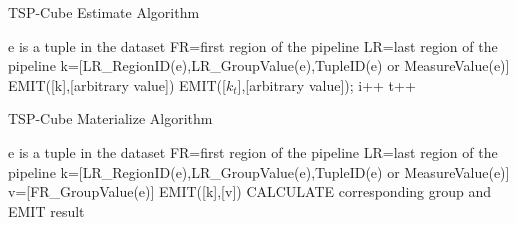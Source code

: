 


{\renewcommand\baselinestretch{1} 
\begin{algorithm}[!htb]
\caption{TSP-Cube Estimate Algorithm}
\label{tscube_mr1}
{\fontfamily{\familydefault}\selectfont

	\begin{algorithmic}[1] %
    	\State e is a tuple in the dataset
    		\State FR=first region of the pipeline
    		\State LR=last region of the pipeline
        	\State k=[LR\_RegionID(e),LR\_GroupValue(e),TupleID(e) or MeasureValue(e)]
        	\State EMIT([k],[arbitrary value])
        \EndFor
   	 \EndFunction
   	 \State
     		 \State	
     		 EMIT([${k}_{t}$],[arbitrary value]); i++
     		\EndIf
     		\State t++
     	\EndWhile
     \EndFunction
	\end{algorithmic}	
}
\end{algorithm}



\begin{algorithm}[!htp]
\caption{TSP-Cube Materialize Algorithm}
\label{tscube_mr2}
{\fontfamily{\familydefault}\selectfont

	\begin{algorithmic}[1] %
    	\State e is a tuple in the dataset
    		\State FR=first region of the pipeline
    		\State LR=last region of the pipeline
        	\State k=[LR\_RegionID(e),LR\_GroupValue(e),TupleID(e) or MeasureValue(e)]
        	\State v=[FR\_GroupValue(e)]
        	\State EMIT([k],[v])
        \EndFor
   	 \EndFunction
   	 \State
     			\State
     			CALCULATE corresponding group and EMIT result
     		\EndIf
     	\EndFor
     \EndFunction
	\end{algorithmic}	
}
\end{algorithm}


}
